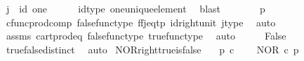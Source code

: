 \begin{isabellebody}
\ {\isachardoublequoteopen}j\ {\isacharequal}{\kern0pt}\ id\ one{\isachardoublequoteclose}\isanewline
\ \ \ \ \isamarkupfalse%
\ id{\isacharunderscore}{\kern0pt}type\ one{\isacharunderscore}{\kern0pt}unique{\isacharunderscore}{\kern0pt}element\ \isamarkupfalse%
\ blast\isanewline
\ \ \isamarkupfalse%
\ \isamarkupfalse%
\ {\isachardoublequoteopen}{\isasymlangle}{\isasymf}{\isacharcomma}{\kern0pt}{\isasymf}{\isasymrangle}\ {\isacharequal}{\kern0pt}\ {\isasymlangle}{\isasymt}{\isacharcomma}{\kern0pt}p{\isasymrangle}{\isachardoublequoteclose}\isanewline
\ \ \ \ \isamarkupfalse%
\ cfunc{\isacharunderscore}{\kern0pt}prod{\isacharunderscore}{\kern0pt}comp\ false{\isacharunderscore}{\kern0pt}func{\isacharunderscore}{\kern0pt}type\ ff{\isacharunderscore}{\kern0pt}j{\isacharunderscore}{\kern0pt}eq{\isacharunderscore}{\kern0pt}tp\ id{\isacharunderscore}{\kern0pt}right{\isacharunderscore}{\kern0pt}unit{}\ j{\isacharunderscore}{\kern0pt}type\ \isamarkupfalse%
\ auto\isanewline
\ \ \isamarkupfalse%
\ \isamarkupfalse%
\ {\isachardoublequoteopen}{\isasymf}\ {\isacharequal}{\kern0pt}\ {\isasymt}{\isachardoublequoteclose}\isanewline
\ \ \ \ \isamarkupfalse%
\ assms\ cart{\isacharunderscore}{\kern0pt}prod{\isacharunderscore}{\kern0pt}eq{}\ false{\isacharunderscore}{\kern0pt}func{\isacharunderscore}{\kern0pt}type\ true{\isacharunderscore}{\kern0pt}func{\isacharunderscore}{\kern0pt}type\ \isamarkupfalse%
\ auto\isanewline
\ \ \isamarkupfalse%
\ \isamarkupfalse%
\ False\isanewline
\ \ \ \ \isamarkupfalse%
\ true{\isacharunderscore}{\kern0pt}false{\isacharunderscore}{\kern0pt}distinct\ \isamarkupfalse%
\ auto\isanewline
{}\isamarkupfalse%
%
\endisatagproof
{\isafoldproof}%
%
\isadelimproof
\isanewline
%
\endisadelimproof
\isanewline
{}\isamarkupfalse%
\ NOR{\isacharunderscore}{\kern0pt}right{\isacharunderscore}{\kern0pt}true{\isacharunderscore}{\kern0pt}is{\isacharunderscore}{\kern0pt}false{\isacharcolon}{\kern0pt}\isanewline
\ \ \ {\isachardoublequoteopen}p\ {\isasymin}\isactrlsub c\ {\isasymOmega}{\isachardoublequoteclose}\isanewline
\ \ \ {\isachardoublequoteopen}NOR\ {\isasymcirc}\isactrlsub c\ {\isasymlangle}p{\isacharcomma}{\kern0pt}{\isasymt}{\isasymrangle}\ {\isacharequal}{\kern0pt}\ {\isasymf}{\isachardoublequoteclose}\isanewline
%
\isadelimproof
%

\end{isabellebody}
